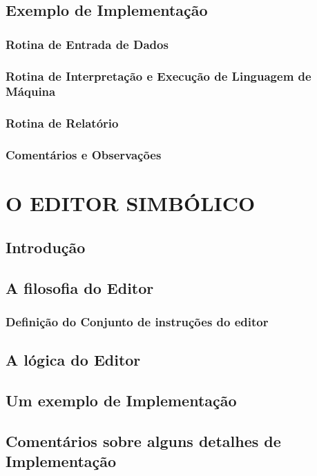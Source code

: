 \documentclass[a4paper,12pt]{article}
\begin{document}
\subsection{Exemplo de Implementação}
\subsubsection{Rotina de Entrada de Dados}
\subsubsection{Rotina de Interpretação e Execução de Linguagem de Máquina}
\subsubsection{Rotina de Relatório}
\subsubsection{Comentários e Observações}

\section{O EDITOR SIMBÓLICO}
\subsection{Introdução}
\subsection{A filosofia do Editor}
\subsubsection{Definição do Conjunto de instruções do editor}

\subsection{A lógica do Editor}

\subsection{Um exemplo de Implementação}

\subsection{Comentários sobre alguns detalhes de Implementação}
\end{document}
